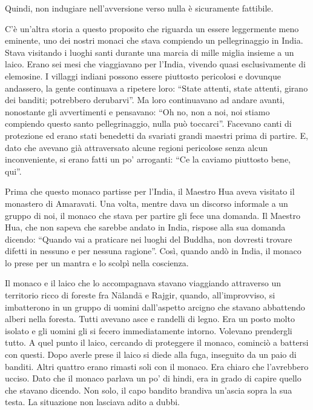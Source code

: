 Quindi, non indugiare nell'avversione verso nulla è sicuramente fattibile.

C'è un'altra storia a questo proposito che riguarda un essere leggermente meno eminente, uno dei nostri monaci che stava compiendo un pellegrinaggio in India. Stava visitando i luoghi santi durante una marcia di mille miglia insieme a un laico. Erano sei mesi che viaggiavano per l'India, vivendo quasi esclusivamente di elemosine. I villaggi indiani possono essere piuttosto pericolosi e dovunque andassero, la gente continuava a ripetere loro: ``State attenti, state attenti, girano dei banditi; potrebbero derubarvi''. Ma loro continuavano ad andare avanti, nonostante gli avvertimenti e pensavano: ``Oh no, non a noi, noi stiamo compiendo questo santo pellegrinaggio, nulla può toccarci''. Facevano canti di protezione ed erano stati benedetti da svariati grandi maestri prima di partire. E, dato che avevano già attraversato alcune regioni pericolose senza alcun inconveniente, si erano fatti un po' arroganti: ``Ce la caviamo piuttosto bene, qui''.

Prima che questo monaco partisse per l'India, il Maestro Hua aveva visitato il monastero di Amaravati. Una volta, mentre dava un discorso informale a un gruppo di noi, il monaco che stava per partire gli fece una domanda. Il Maestro Hua, che non sapeva che sarebbe andato in India, rispose alla sua domanda dicendo: ``Quando vai a praticare nei luoghi del Buddha, non dovresti trovare difetti in nessuno e per nessuna ragione''. Così, quando andò in India, il monaco lo prese per un mantra e lo scolpì nella coscienza.

Il monaco e il laico che lo accompagnava stavano viaggiando attraverso un territorio ricco di foreste fra Nālandā e Rajgir, quando, all'improvviso, si imbatterono in un gruppo di uomini dall'aspetto arcigno che stavano abbattendo alberi nella foresta. Tutti avevano asce e randelli di legno. Era un posto molto isolato e gli uomini gli si fecero immediatamente intorno. Volevano prendergli tutto. A quel punto il laico, cercando di proteggere il monaco, cominciò a battersi con questi. Dopo averle prese il laico si diede alla fuga, inseguito da un paio di banditi. Altri quattro erano rimasti soli con il monaco. Era chiaro che l'avrebbero ucciso. Dato che il monaco parlava un po' di hindi, era in grado di capire quello che stavano dicendo. Non solo, il capo bandito brandiva un'ascia sopra la sua testa. La situazione non lasciava adito a dubbi.

